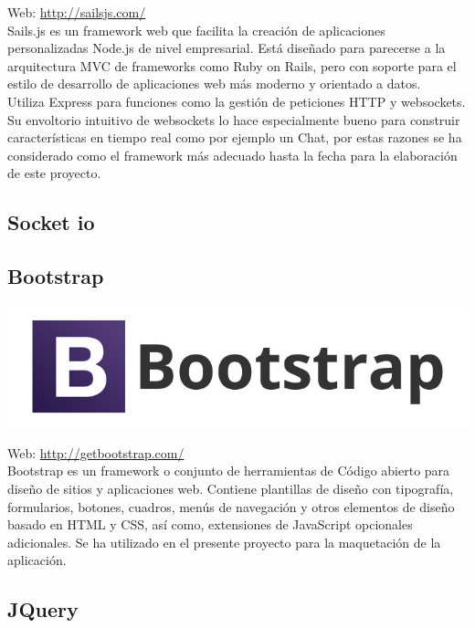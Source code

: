 Web: \url{http://sailsjs.com/}\\

Sails.js es un framework web que facilita la creación de aplicaciones personalizadas Node.js de nivel empresarial. Está diseñado para parecerse a la arquitectura MVC de frameworks como Ruby on Rails, pero con soporte para el estilo de desarrollo de aplicaciones web más moderno y orientado a datos.\\

Utiliza Express para funciones como la gestión de peticiones HTTP y websockets. Su envoltorio intuitivo de websockets lo hace especialmente bueno para construir características en tiempo real como por ejemplo un Chat, por estas razones se ha considerado como el framework más adecuado hasta la fecha para la elaboración de este proyecto.

\subsection{Socket io}




\subsection{Bootstrap}


\begin{center}
\includegraphics[scale=0.3]{imagenes/bootstrap-logo.jpg}
\end{center}

Web: \url{http://getbootstrap.com/}\\

Bootstrap es un framework o conjunto de herramientas de Código abierto para diseño de sitios y aplicaciones web. Contiene plantillas de diseño con tipografía, formularios, botones, cuadros, menús de navegación y otros elementos de diseño basado en HTML y CSS, así como, extensiones de JavaScript opcionales adicionales. Se ha utilizado en el presente proyecto para la maquetación de la aplicación.

\subsection{JQuery}


